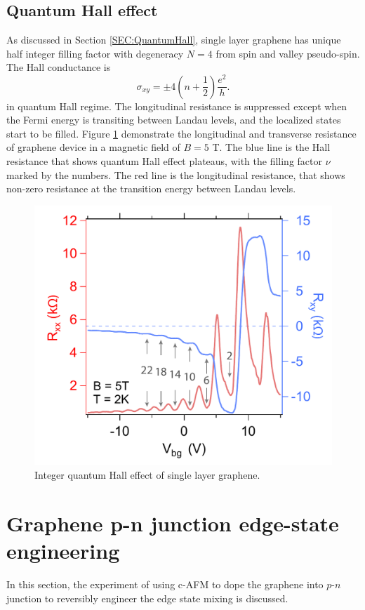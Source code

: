 \documentclass[pdflatex, sectionletters, 12pt]{pittetd}    %
\begin{document}
\subsection{Quantum Hall effect}

As discussed in Section \ref{SEC:QuantumHall}, single layer graphene has unique half integer filling factor with degeneracy $N = 4$ from spin and valley pseudo-spin. The Hall conductance is
$$
\sigma_{xy} = \pm 4\left(n + \frac{1}{2}\right)\frac{e^2}{h}.
$$
in quantum Hall regime. The longitudinal resistance is suppressed except when the Fermi energy is transiting between Landau levels, and the localized states start to be filled. Figure \ref{FIG:HallResistance} demonstrate the longitudinal and transverse resistance of graphene device in a magnetic field of $B = 5$ T. The blue line is the Hall resistance that shows quantum Hall effect plateaus, with the filling factor $\nu$ marked by the numbers. The red line is the longitudinal resistance, that shows non-zero resistance at the transition energy between Landau levels.
\\

\begin{figure}[h!]
	\centering
	\includegraphics[width=.7\textwidth]{Drawing/HallResistance.pdf}
	\caption{Integer quantum Hall effect of single layer graphene.}
	\label{FIG:HallResistance}
\end{figure}

\section{Graphene p-n junction edge-state engineering}

In this section, the experiment of using c-AFM to dope the graphene into $p$-$n$ junction to reversibly engineer the edge state mixing is discussed.
\end{document}
